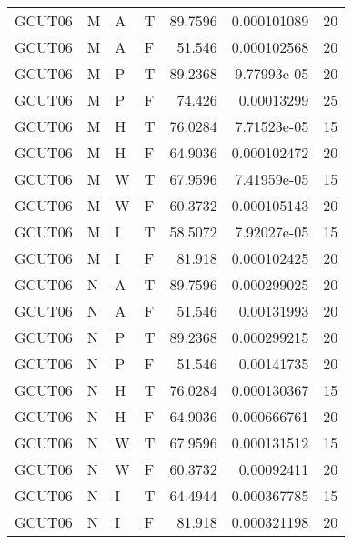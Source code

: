 \begin{tabular}{llllrrr}
    GCUT06   & M     & A     & T          & 89.7596    & 0.000101089 & 20       \\
    GCUT06   & M     & A     & F          & 51.546     & 0.000102568 & 20       \\
    GCUT06   & M     & P     & T          & 89.2368    & 9.77993e-05 & 20       \\
    GCUT06   & M     & P     & F          & 74.426     & 0.00013299  & 25       \\
    GCUT06   & M     & H     & T          & 76.0284    & 7.71523e-05 & 15       \\
    GCUT06   & M     & H     & F          & 64.9036    & 0.000102472 & 20       \\
    GCUT06   & M     & W     & T          & 67.9596    & 7.41959e-05 & 15       \\
    GCUT06   & M     & W     & F          & 60.3732    & 0.000105143 & 20       \\
    GCUT06   & M     & I     & T          & 58.5072    & 7.92027e-05 & 15       \\
    GCUT06   & M     & I     & F          & 81.918     & 0.000102425 & 20       \\
    GCUT06   & N     & A     & T          & 89.7596    & 0.000299025 & 20       \\
    GCUT06   & N     & A     & F          & 51.546     & 0.00131993  & 20       \\
    GCUT06   & N     & P     & T          & 89.2368    & 0.000299215 & 20       \\
    GCUT06   & N     & P     & F          & 51.546     & 0.00141735  & 20       \\
    GCUT06   & N     & H     & T          & 76.0284    & 0.000130367 & 15       \\
    GCUT06   & N     & H     & F          & 64.9036    & 0.000666761 & 20       \\
    GCUT06   & N     & W     & T          & 67.9596    & 0.000131512 & 15       \\
    GCUT06   & N     & W     & F          & 60.3732    & 0.00092411  & 20       \\
    GCUT06   & N     & I     & T          & 64.4944    & 0.000367785 & 15       \\
    GCUT06   & N     & I     & F          & 81.918     & 0.000321198 & 20       \\
    \hline
\end{tabular}
